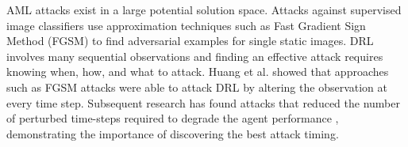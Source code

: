 \documentclass[conference,compsoc]{IEEEtran}
\begin{document}
AML attacks exist in a large potential solution space. Attacks against supervised image classifiers use approximation techniques such as Fast Gradient Sign Method (FGSM) \cite{goodfellow_explaining_2015} to find adversarial examples for single static images. DRL involves many sequential observations and finding an effective attack requires knowing when, how, and what to attack. Huang et al. \cite{huang_adversarial_2017} showed that approaches such as FGSM attacks were able to attack DRL by altering the observation at every time step. Subsequent research has found attacks that reduced the number of perturbed time-steps required to degrade the agent performance  \cite{lin_tactics_2017,sun_stealthy_2020,qiaoben_strategically-timed_2021}, demonstrating the importance of discovering the best attack timing. 
\end{document}
